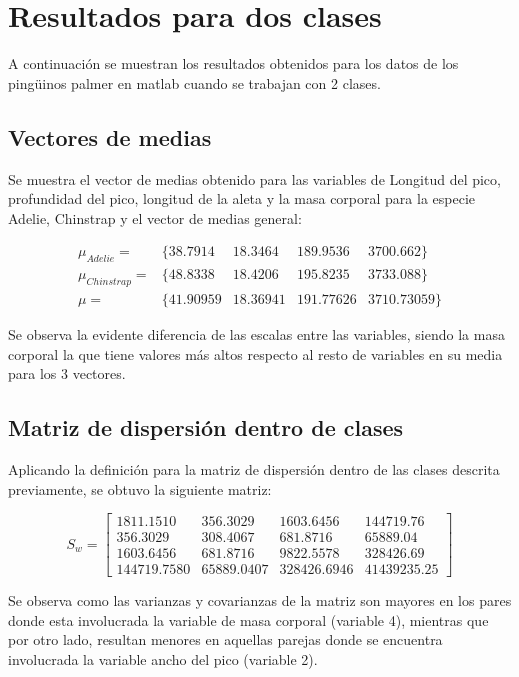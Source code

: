 \documentclass[11pt, letterpaper]{article}
\begin{document}
\newpage
	
\section{Resultados para dos clases}

A continuación se muestran los resultados obtenidos para los datos de los pingüinos palmer en matlab cuando se trabajan con 2 clases. 

\subsection{Vectores de medias}

Se muestra el vector de medias obtenido para las variables de Longitud del pico, profundidad del pico, longitud de la aleta y la masa corporal para la especie Adelie, Chinstrap y el vector de medias general:

$$
\begin{matrix}
	\mu_{Adelie} =  &\{38.7914 & 18.3464 & 189.9536 & 3700.662\}	 \\
	\mu_{Chinstrap} = & \{48.8338 & 18.4206 & 195.8235 & 3733.088\}	 \\
	\mu = & \{41.90959 & 18.36941 & 191.77626 & 3710.73059 \}	 
\end{matrix}
$$


Se observa la evidente diferencia de las escalas entre las variables, siendo la masa corporal la que tiene valores más altos respecto al resto de variables en su media para los 3 vectores.

\subsection{Matriz de dispersión dentro de clases}

Aplicando la definición para la matriz de dispersión dentro de las clases descrita previamente, se obtuvo la siguiente matriz:

$$
S_w = 
\begin{bmatrix}
1811.1510 & 356.3029 & 1603.6456 & 144719.76\\
356.3029 & 308.4067 & 681.8716 & 65889.04\\
1603.6456 & 681.8716 & 9822.5578 & 328426.69\\
144719.7580 & 65889.0407 & 328426.6946 & 41439235.25
\end{bmatrix}
$$

Se observa como las varianzas y covarianzas de la matriz son mayores en los pares donde esta involucrada la variable de masa corporal (variable 4), mientras que por otro lado, resultan menores en aquellas parejas donde se encuentra involucrada la variable ancho del pico (variable 2).
\end{document}
